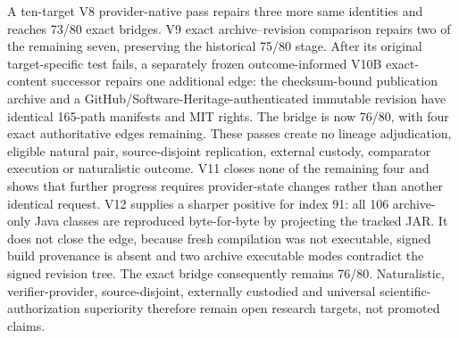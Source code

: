 A ten-target V8 provider-native pass repairs three more same identities and
reaches 73/80 exact bridges.  V9 exact archive--revision comparison repairs two
of the remaining seven, preserving the historical 75/80 stage.  After its
original target-specific test fails, a separately frozen outcome-informed
V10B exact-content successor repairs one additional edge: the checksum-bound
publication archive and a GitHub/Software-Heritage-authenticated immutable
revision have identical 165-path manifests and MIT rights.  The bridge is now
76/80, with four exact authoritative edges remaining.  These passes create no
lineage adjudication, eligible natural pair, source-disjoint replication,
external custody, comparator execution or naturalistic outcome.
V11 closes none of the remaining four and shows that further progress requires
provider-state changes rather than another identical request.  V12 supplies a
sharper positive for index 91: all 106 archive-only Java classes are reproduced
byte-for-byte by projecting the tracked JAR.  It does not close the edge,
because fresh compilation was not executable, signed build provenance is
absent and two archive executable modes contradict the signed revision tree.
The exact bridge consequently remains 76/80.
Naturalistic, verifier-provider,
source-disjoint, externally custodied and universal scientific-authorization
superiority therefore remain open research targets, not promoted claims.




\appendix
